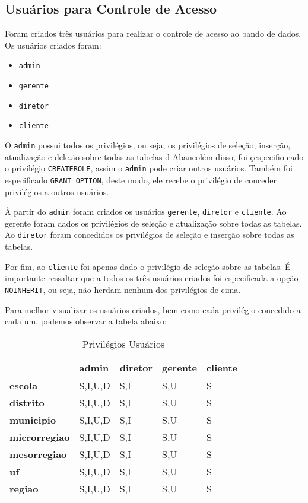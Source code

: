 \documentclass[12pt,a4paper]{article}
\begin{document}
\subsection{Usuários para Controle de Acesso}

Foram criados três usuários para realizar o controle de acesso ao bando de dados. Os usuários criados foram:

\begin{itemize}
    \item \texttt{admin}
    \item \texttt{gerente}
    \item \texttt{diretor}
    \item \texttt{cliente}
\end{itemize}

O \texttt{admin} possui todos os privilégios, ou seja, os privilégios de seleção, inserção, atualização e dele.ão sobre todas as tabelas d Abancolém disso, foi çespecifio cado o privilégio \texttt{CREATEROLE}, assim o \texttt{admin} pode criar outros usuários. Também foi especificado \texttt{GRANT OPTION}, deste modo, ele recebe o privilégio de conceder privilégios a outros usuários.

À partir do \texttt{admin} foram criados os usuários \texttt{gerente}, \texttt{diretor} e \texttt{cliente}. Ao gerente foram dados os privilégios de seleção e atualização sobre todas as tabelas. Ao \texttt{diretor} foram concedidos os privilégios de seleção e inserção sobre todas as tabelas.

Por fim, ao \texttt{cliente} foi apenas dado o privilégio de seleção sobre as tabelas. É importante ressaltar que a todos os três usuários criados foi especificada a opção \texttt{NOINHERIT}, ou seja, não herdam nenhum dos privilégios de cima.

Para melhor visualizar os usuários criados, bem como cada privilégio concedido a cada um, podemos observar a tabela abaixo:

\begin{table}[htbp]
  \centering
  \caption{Privilégios Usuários}
    \begin{tabular}{|l|l|l|l|l|}
    \toprule
    \hline
          & \textbf{admin} & \textbf{diretor} & \textbf{gerente} & \textbf{cliente} \\
    \midrule
    \hline
    \textbf{escola} & S,I,U,D & S,I   & S,U   & S \\
    \midrule
    \textbf{distrito} & S,I,U,D & S,I   & S,U   & S \\
    \midrule
    \textbf{municipio} & S,I,U,D & S,I   & S,U   & S \\
    \midrule
    \textbf{microrregiao} & S,I,U,D & S,I   & S,U   & S \\
    \midrule
    \textbf{mesorregiao} & S,I,U,D & S,I   & S,U   & S \\
    \midrule
    \textbf{uf} & S,I,U,D & S,I   & S,U   & S \\
    \midrule
    \textbf{regiao} & S,I,U,D & S,I   & S,U   & S \\
    \bottomrule
    \hline
    \end{tabular}%
  \label{tab:addlabel}%
\end{table}%
\end{document}
